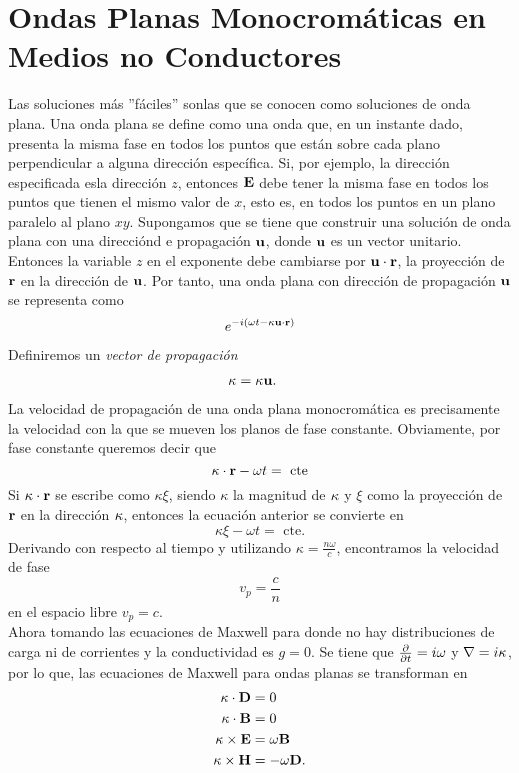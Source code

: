 \section{Ondas Planas Monocromáticas en Medios no Conductores}
Las soluciones más ''fáciles'' sonlas que se conocen como soluciones de onda plana. Una onda plana se define como una onda que, en un instante dado, presenta la misma fase en todos los puntos que están sobre cada plano perpendicular a alguna dirección específica. Si, por ejemplo, la dirección especificada esla dirección $z$, entonces $\vb{E}$ debe tener la misma fase en todos los puntos que tienen el mismo valor de $x$, esto es, en todos los puntos en un plano paralelo al plano $xy$. Supongamos que se tiene que construir una solución de onda plana con una direcciónd e propagación $\vb{u}$, donde $\vb{u}$ es un vector unitario. Entonces la variable $z$ en el exponente debe cambiarse por $\vb{u} \cdot \vb{r}$, la proyección de $\vb{r}$ en la dirección de $\vb{u}$. Por tanto, una onda plana con dirección de propagación $\vb{u}$ se representa como
\begin{align*}
	e^{-i(\omega t - \kappa \vb{u} \cdot \vb{r})}
\end{align*}
Definiremos un \textit{vector de propagación}
\begin{align*}
	\vb{\kappa} &= \kappa \vb{u}.
\end{align*}
La velocidad de propagación de una onda plana monocromática es precisamente la velocidad con la que se mueven los planos de fase constante. Obviamente, por fase constante queremos decir que
\begin{equation}
	\vb{\kappa} \cdot \vb{r} - \omega t = \text{ cte}
\end{equation}
Si $\vb{\kappa} \cdot \vb{r}$ se escribe como $\kappa \xi$, siendo $\kappa$ la magnitud de $\vb{\kappa}$ y $\xi$ como la proyección de $\vb{r}$ en la dirección $\vb{\kappa}$, entonces la ecuación anterior se convierte en 
\begin{equation}
	\kappa \xi - \omega t = \text{ cte}.
\end{equation}
Derivando con respecto al tiempo y utilizando $\kappa = \frac{n\omega}{c}$, encontramos la velocidad de fase
\begin{equation}
	v_p = \frac{c}{n}
\end{equation}
en el espacio libre $v_p = c$. \\


Ahora tomando las ecuaciones de Maxwell para donde no hay distribuciones de carga ni de corrientes y la conductividad es $g=0$. Se tiene que $\pdv{t} = i\omega$ y $\nabla = i\vb{\kappa}$, por lo que, las ecuaciones de Maxwell para ondas planas se transforman en
\begin{align}
	\vb{\kappa} \cdot \vb{D} &= 0 \\
	\vb{\kappa} \cdot \vb{B} &= 0 \\
	\vb{\kappa} \times \vb{E} &= \omega \vb{B} \\
	\vb{\kappa} \times \vb{H} &= -\omega \vb{D}.
\end{align}

